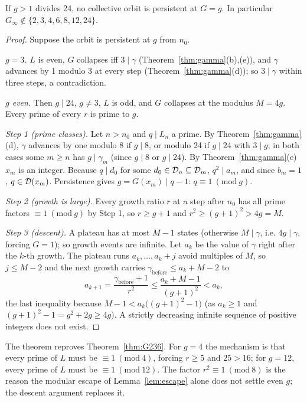 \begin{theorem}\label{thm:G24}
If \(g>1\) divides 24, no collective orbit is persistent at \(G=g\). In particular \(G_\infty\notin\{2,3,4,6,8,12,24\}\).
\end{theorem}
\begin{proof}
Suppose the orbit is persistent at \(g\) from \(n_0\).

\emph{\(g=3\).} \(L\) is even, \(G\) collapses iff \(3\mid\gamma\) (Theorem~\ref{thm:gamma}(b),(e)), and \(\gamma\) advances by 1 modulo 3 at every step (Theorem~\ref{thm:gamma}(d)); so \(3\mid\gamma\) within three steps, a contradiction.

\emph{\(g\) even.} Then \(g\mid24\), \(g\ne3\), \(L\) is odd, and \(G\) collapses at the modulus \(M=4g\). Every prime of every \(r\) is prime to \(g\).

\emph{Step 1 (prime classes).} Let \(n>n_0\) and \(q\mid L_n\) a prime. By Theorem~\ref{thm:gamma}(d), \(\gamma\) advances by one modulo 8 if \(g\mid8\), or modulo 24 if \(g\mid24\) with \(3\mid g\); in both cases some \(m\ge n\) has \(g\mid\gamma_m\) (since \(g\mid 8\) or \(g\mid 24\)). By Theorem~\ref{thm:gamma}(e) \(x_m\) is an integer. Because \(q\mid d_0\) for some \(d_0\in\mathcal{D}_n\subseteq\mathcal{D}_m\), \(q^2\mid a_m\), and since \(b_m=1\), \(q\in\mathcal{D}(x_m)\). Persistence gives \(g=G(x_m)\mid q-1\): \(q\equiv1\ (\mathrm{mod}\ g)\).

\emph{Step 2 (growth is large).} Every growth ratio \(r\) at a step after \(n_0\) has all prime factors \(\equiv1\ (\mathrm{mod}\ g)\) by Step 1, so \(r\ge g+1\) and \(r^2\ge(g+1)^2>4g=M\).

\emph{Step 3 (descent).} A plateau has at most \(M-1\) states (otherwise \(M\mid\gamma\), i.e. \(4g\mid\gamma\), forcing \(G=1\)); so growth events are infinite. Let \(a_k\) be the value of \(\gamma\) right after the \(k\)-th growth. The plateau runs \(a_k,\dots,a_k+j\) avoid multiples of \(M\), so \(j\le M-2\) and the next growth carries \(\gamma_{\mathrm{before}}\le a_k+M-2\) to
\[
a_{k+1}=\frac{\gamma_{\mathrm{before}}+1}{r^2}\le\frac{a_k+M-1}{(g+1)^2}<a_k,
\]
the last inequality because \(M-1<a_k\big((g+1)^2-1\big)\) (as \(a_k\ge1\) and \((g+1)^2-1=g^2+2g\ge4g\)). A strictly decreasing infinite sequence of positive integers does not exist.
\end{proof}

The theorem reproves Theorem~\ref{thm:G236}. For \(g=4\) the mechanism is that every prime of \(L\) must be \(\equiv1\ (\mathrm{mod}\ 4)\), forcing \(r\ge5\) and \(25>16\); for \(g=12\), every prime of \(L\) must be \(\equiv1\ (\mathrm{mod}\ 12)\). The factor \(r^2\equiv1\ (\mathrm{mod}\ 8)\) is the reason the modular escape of Lemma~\ref{lem:escape} alone does not settle even \(g\); the descent argument replaces it.

